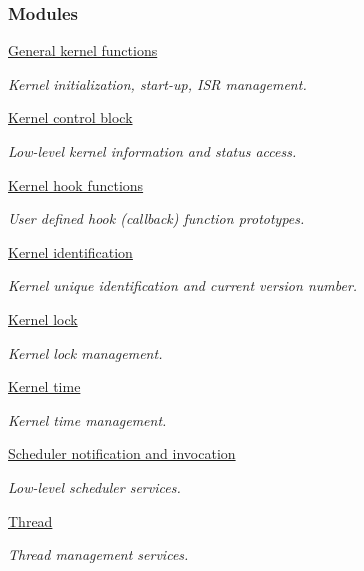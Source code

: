 \subsubsection*{Modules}
\begin{DoxyCompactItemize}
\item 
\hyperlink{group__kern__general}{General kernel functions}
\begin{DoxyCompactList}\small\item\em Kernel initialization, start-\/up, I\-S\-R management. \end{DoxyCompactList}\item 
\hyperlink{group__kern__ctrl}{Kernel control block}
\begin{DoxyCompactList}\small\item\em Low-\/level kernel information and status access. \end{DoxyCompactList}\item 
\hyperlink{group__kern__hook}{Kernel hook functions}
\begin{DoxyCompactList}\small\item\em User defined hook (callback) function prototypes. \end{DoxyCompactList}\item 
\hyperlink{group__kern__id}{Kernel identification}
\begin{DoxyCompactList}\small\item\em Kernel unique identification and current version number. \end{DoxyCompactList}\item 
\hyperlink{group__kern__lock}{Kernel lock}
\begin{DoxyCompactList}\small\item\em Kernel lock management. \end{DoxyCompactList}\item 
\hyperlink{group__kern__time}{Kernel time}
\begin{DoxyCompactList}\small\item\em Kernel time management. \end{DoxyCompactList}\item 
\hyperlink{group__kern__sched}{Scheduler notification and invocation}
\begin{DoxyCompactList}\small\item\em Low-\/level scheduler services. \end{DoxyCompactList}\item 
\hyperlink{group__kern__thd}{Thread}
\begin{DoxyCompactList}\small\item\em Thread management services. \end{DoxyCompactList}\item 

\end{DoxyCompactItemize}
